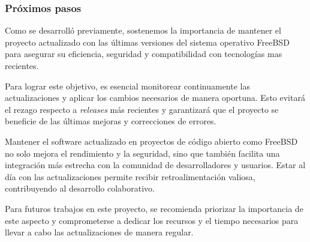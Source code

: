 \subsubsection{Próximos pasos}

Como se desarrolló previamente, sostenemos la importancia de mantener el proyecto actualizado con las últimas versiones del sistema operativo FreeBSD para asegurar su eficiencia, seguridad y compatibilidad con tecnologías mas recientes.

Para lograr este objetivo, es esencial monitorear continuamente las actualizaciones y aplicar los cambios necesarios de manera oportuna. Esto evitará el rezago respecto a \textit{releases} más recientes y garantizará que el proyecto se beneficie de las últimas mejoras y correcciones de errores.

Mantener el software actualizado en proyectos de código abierto como FreeBSD no solo mejora el rendimiento y la seguridad, sino que también facilita una integración más estrecha con la comunidad de desarrolladores y usuarios. Estar al día con las actualizaciones permite recibir retroalimentación valiosa, contribuyendo al desarrollo colaborativo.

Para futuros trabajos en este proyecto, se recomienda priorizar la importancia de este aspecto y comprometerse a dedicar los recursos y el tiempo necesarios para llevar a cabo las actualizaciones de manera regular.